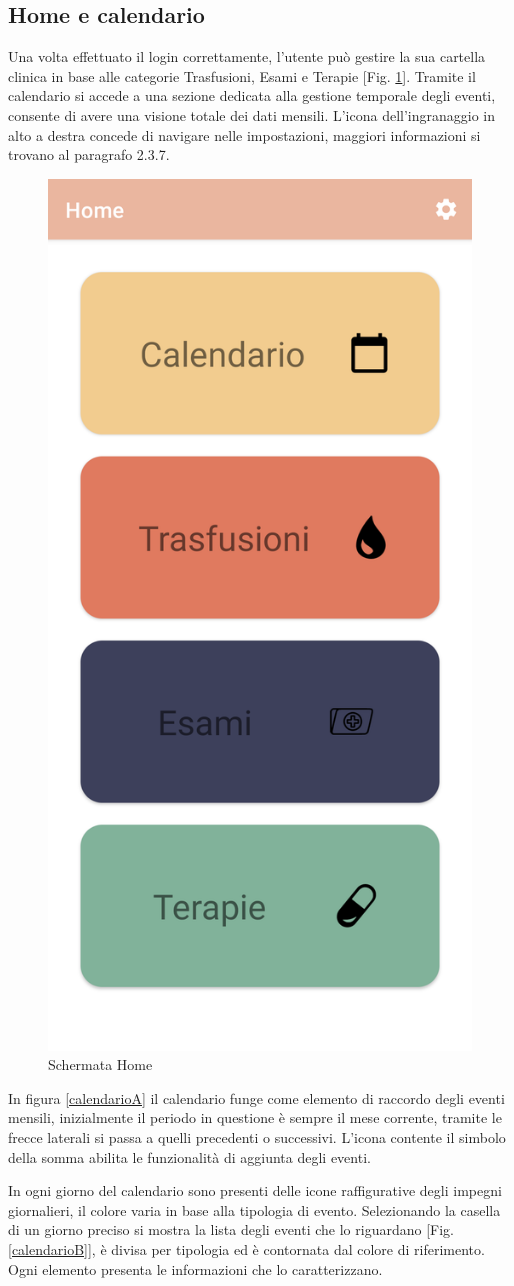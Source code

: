 \documentclass[12pt,a4paper,openright,twoside]{report}
\begin{document}

\subsection{Home e calendario}
Una volta effettuato il login correttamente, l'utente può gestire la sua cartella clinica in base alle categorie Trasfusioni, Esami e Terapie [Fig. \ref{home}].
Tramite il calendario si accede a una sezione dedicata alla gestione temporale degli eventi, consente di avere una visione totale dei dati mensili.
L'icona dell'ingranaggio in alto a destra concede di navigare nelle impostazioni, maggiori informazioni si trovano al paragrafo 2.3.7.

\begin{figure}[H]
\begin{center}
\includegraphics[width=.3\textwidth, keepaspectratio]{img/Screenshots/Home e calendario/Home.png}
\caption{Schermata Home} \label{home}
\end{center}
\end{figure}

In figura \ref{calendarioA} il calendario funge come elemento di raccordo degli eventi mensili, inizialmente il periodo in questione è sempre il mese corrente, tramite le frecce laterali si passa a quelli precedenti o successivi. L'icona contente il simbolo della somma abilita le funzionalità di aggiunta degli eventi.

In ogni giorno del calendario sono presenti delle icone raffigurative degli impegni giornalieri, il colore varia in base alla tipologia di evento. Selezionando la casella di un giorno preciso si mostra la lista degli eventi che lo riguardano [Fig. \ref{calendarioB}], è divisa per tipologia ed è contornata dal colore di riferimento. Ogni elemento presenta le informazioni che lo caratterizzano.
\end{document}
